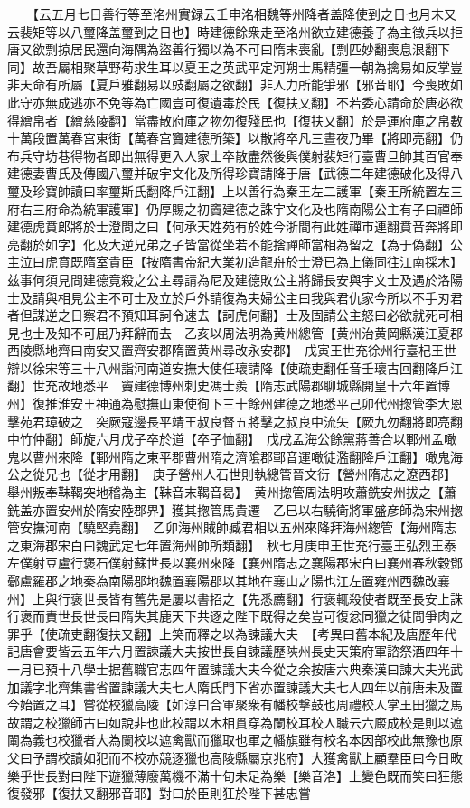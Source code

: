 　　【云五月七日善行等至洺州實録云壬申洺相魏等州降者盖降使到之日也月末又云裴矩等以八璽降盖璽到之日也】時建德餘衆走至洺州欲立建德養子為主徵兵以拒唐又欲剽掠居民還向海隅為盜善行獨以為不可曰隋末喪亂【剽匹妙翻喪息泿翻下同】故吾屬相聚草野苟求生耳以夏王之英武平定河朔士馬精彊一朝為擒易如反掌豈非天命有所屬【夏戶雅翻易以豉翻屬之欲翻】非人力所能爭邪【邪音耶】今喪敗如此守亦無成逃亦不免等為亡國豈可復遺毒於民【復扶又翻】不若委心請命於唐必欲得繒帛者【繒慈陵翻】當盡散府庫之物勿復殘民也【復扶又翻】於是運府庫之帛數十萬段置萬春宫東街【萬春宫竇建德所築】以散將卒凡三晝夜乃畢【將即亮翻】仍布兵守坊巷得物者即出無得更入人家士卒散盡然後與僕射裴矩行臺曹旦帥其百官奉建德妻曹氏及傳國八璽并破宇文化及所得珍寶請降于唐【武德二年建德破化及得八璽及珍寶帥讀曰率璽斯氏翻降戶江翻】上以善行為秦王左二護軍【秦王所統置左三府右三府命為統軍護軍】仍厚賜之初竇建德之誅宇文化及也隋南陽公主有子曰禪師建德虎賁郎將於士澄問之曰【何承天姓苑有於姓今浙間有此姓禪市連翻賁音奔將即亮翻於如字】化及大逆兄弟之子皆當從坐若不能捨禪師當相為留之【為于偽翻】公主泣曰虎賁既隋室貴臣【按隋書帝紀大業初造龍舟於士澄已為上儀同往江南採木】兹事何須見問建德竟殺之公主尋請為尼及建德敗公主將歸長安與宇文士及遇於洛陽士及請與相見公主不可士及立於戶外請復為夫婦公主曰我與君仇家今所以不手刃君者但謀逆之日察君不預知耳訶令速去【訶虎何翻】士及固請公主怒曰必欲就死可相見也士及知不可屈乃拜辭而去　乙亥以周法明為黄州總管【黄州治黄岡縣漢江夏郡西陵縣地齊曰南安又置齊安郡隋置黄州尋改永安郡】　戊寅王世充徐州行臺杞王世辯以徐宋等三十八州詣河南道安撫大使任瓌請降【使疏吏翻任音壬瓌古回翻降戶江翻】世充故地悉平　竇建德博州刺史馮士羨【隋志武陽郡聊城縣開皇十六年置博州】復推淮安王神通為慰撫山東使徇下三十餘州建德之地悉平己卯代州揔管李大恩擊苑君璋破之　突厥寇邊長平靖王叔良督五將擊之叔良中流矢【厥九勿翻將即亮翻中竹仲翻】師旋六月戊子卒於道【卒子恤翻】　戊戌孟海公餘黨蔣善合以鄆州孟噉鬼以曹州來降【鄆州隋之東平郡曹州隋之濟隂郡鄆音運噉徒濫翻降戶江翻】噉鬼海公之從兄也【從才用翻】　庚子營州人石世則執總管晉文衍【營州隋志之遼西郡】舉州叛奉靺鞨突地稽為主【靺音末鞨音曷】　黄州揔管周法明攻蕭銑安州拔之【蕭銑盖亦置安州於隋安陸郡界】獲其揔管馬貴遷　乙巳以右驍衛將軍盛彦師為宋州揔管安撫河南【驍堅堯翻】　乙卯海州賊帥臧君相以五州來降拜海州緫管【海州隋志之東海郡宋白曰魏武定七年置海州帥所類翻】　秋七月庚申王世充行臺王弘烈王泰左僕射豆盧行褒石僕射蘇世長以襄州來降【襄州隋志之襄陽郡宋白曰襄州春秋穀鄧鄾盧羅郡之地秦為南陽郡地魏置襄陽郡以其地在襄山之陽也江左置雍州西魏改襄州】上與行褒世長皆有舊先是屢以書招之【先悉薦翻】行褒輒殺使者既至長安上誅行褒而責世長世長曰隋失其鹿天下共逐之陛下既得之矣豈可復忿同獵之徒問爭肉之罪乎【使疏吏翻復扶又翻】上笑而釋之以為諫議大夫　【考異曰舊本紀及唐歷年代記唐會要皆云五年六月置諫議大夫按世長自諫議歷陜州長史天策府軍諮祭酒四年十一月已預十八學士据舊職官志四年置諫議大夫今從之余按唐六典秦漢曰諫大夫光武加議字北齊集書省置諫議大夫七人隋氏門下省亦置諫議大夫七人四年以前唐未及置今始置之耳】嘗從校獵高陵【如淳曰合軍聚衆有幡校撃鼓也周禮校人掌王田獵之馬故謂之校獵師古曰如說非也此校謂以木相貫穿為闌校耳校人職云六廄成校是則以遮閳為義也校獵者大為闌校以遮禽獸而獵取也軍之幡旗雖有校名本因部校此無豫也原父曰予謂校讀如犯而不校亦競逐獵也高陵縣屬京兆府】大獲禽獸上顧羣臣曰今日畋樂乎世長對曰陛下遊獵薄廢萬機不滿十旬未足為樂【樂音洛】上變色既而笑曰狂態復發邪【復扶又翻邪音耶】對曰於臣則狂於陛下甚忠嘗